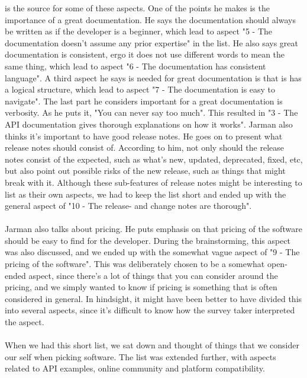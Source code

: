 \documentclass{cslthse-msc}
\begin{document}
    \citet{jarman} is the source for some of these
    aspects. One of the points he makes is the importance of a great documentation.
    He says the documentation should always be written as if the developer is
    a beginner, which lead to aspect "5 - The documentation doesn't assume any prior expertise" in the list.
    He also says great documentation is consistent, ergo it does not use different
    words to mean the same thing, which lead to aspect "6 - The documentation has consistent language".
    A third aspect he says is needed for great documentation is that is has a
    logical structure, which lead to aspect "7 - The documentation is easy to navigate".
    The last part he considers important for a great documentation is verbosity.
    As he puts it, "You can never say too much". This resulted in "3 - The API documentation gives thorough explanations on how it works".
    Jarman also thinks it's important to have good release notes. He goes on
    to present what release notes should consist of. According to him, not
    only should the release notes consist of the expected, such as what's new,
    updated, deprecated, fixed, etc, but also point out possible risks of the new release,
    such as things that might break with it. Although these sub-features of release notes
    might be interesting to list as their own aspects, we had to keep the list short
    and ended up with the general aspect of "10 - The release- and change notes are thorough".
    \\ \\
    Jarman also talks about pricing. He puts emphasis on that pricing of the software
    should be easy to find for the developer. During the brainstorming, this
    aspect was also discussed, and we ended up with the somewhat vague
    aspect of "9 - The pricing of the software". This was deliberately chosen
    to be a somewhat open-ended aspect, since there's a lot of things that you can
    consider around the pricing, and we simply wanted to know if pricing is something
    that is often considered in general. In hindsight, it might have been better to have
    divided this into several aspects, since it's difficult to know how the
    survey taker interpreted the aspect.
    \\ \\
    When we had this short list, we sat down and thought of things that we
    consider our self when picking software. The list was extended further,
    with aspects related to API examples, online community and  platform compatibility.
    \\ \\
\end{document}
